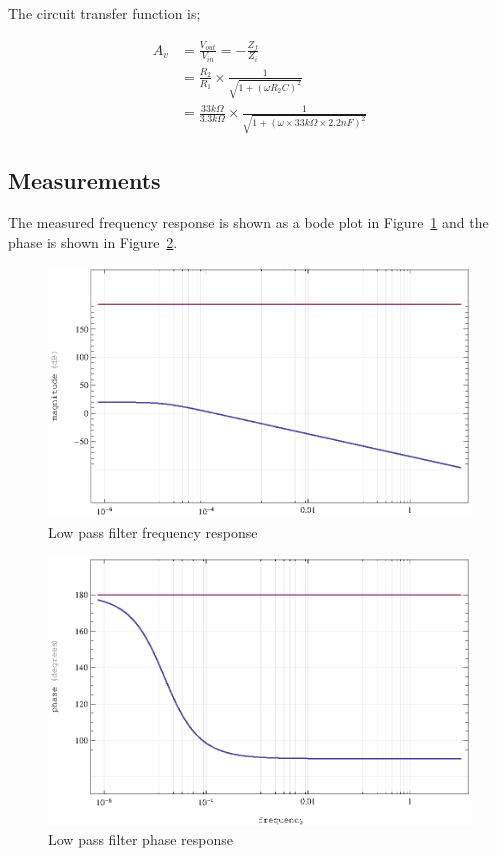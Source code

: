 \documentclass[11pt,a4paper]{article}
\begin{document}
The circuit transfer function is;

\begin{align} 
A_v     &= \frac{V_{out}}{V_{in}} = -\frac{Z_f}{Z_i}\\
        &= \frac{R_2}{R_1} \times \frac{1}{\sqrt{1+\left(\omega R_2 C\right)^2}}\\
        &= \frac{33k\Omega}{3.3k\Omega} \times \frac{1}{\sqrt{1+\left(\omega \times 33k\Omega \times 2.2nF\right)^2}}
\end{align}


\subsection{Measurements}\label{lpf-measurements}
The measured frequency response is shown as a bode plot in Figure~\ref{fig:lpf-magnitude} and the phase is shown in Figure~\ref{fig:lpf-phase}.

\begin{figure}[htbp]
    \centering
        \includegraphics[]{img/lpf-magnitude.eps}
    \caption{Low pass filter frequency response}
    \label{fig:lpf-magnitude}
\end{figure}

\begin{figure}[htbp]
    \centering
        \includegraphics[]{img/lpf-phase.eps}
    \caption{Low pass filter phase response}
    \label{fig:lpf-phase}
\end{figure}
\end{document}
